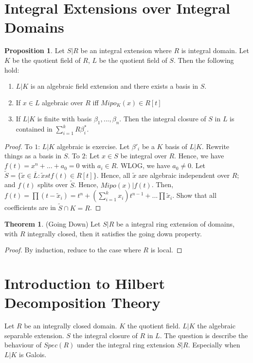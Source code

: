\documentclass{article}
\theoremstyle{definition}
\newtheorem{theorem}{Theorem}[section]
\theoremstyle{definition}
\theoremstyle{definition}
\newtheorem{proposition}{Proposition}[section]
\theoremstyle{definition}
\theoremstyle{definition}
\theoremstyle{definition}
\theoremstyle{definition}
\begin{document}
\section{Integral Extensions over Integral Domains}

\begin{tcolorbox}[colback=blue!5!white,colframe=blue!30!white]
\begin{proposition}
Let $S|R$ be an integral extension where $R$ is integral domain. Let $K$ be the quotient field of $R$, $L$ be the quotient field of $S$. Then the following hold:
\begin{enumerate}
    \item $L|K$ is an algebraic field extension and there exists a basis in $S$. 
    \item If $x\in L$ algebraic over $R$ iff $Mipo_K(x)\in R[t]$
    \item If $L|K$ is finite with basis $\beta_1,...,\beta_n$. Then the integral closure of $S$ in $L$ is contained in $\sum_{i=1}^{k} R\beta^*_i$. 
\end{enumerate} 
\end{proposition}
\end{tcolorbox}
\begin{proof}
    To $1$: $L|K$ algebraic is exercise.  Let $\beta'_i$ be a $K$ basis of $L|K$. Rewrite things as a basis in $S$. 
    To $2$: Let $x\in S$ be integral over $R$. Hence, we have $f(t)=x^n+...+a_0=0$ with $a_i\in R$. WLOG, we have $a_0\neq 0$. Let $\tilde{S}=\{ \tilde{x}\in \overline{L}: \tilde{x} st f(t)\in R[t] \}$. Hence, all $\tilde{x}$ are algebraic independent over $R$; and $f(t)$ splits over $\tilde{S}$. Hence, $Mipo(x)|f(t)$. Then, $f(t)=\prod (t-\tilde{x}_i)=t^n+(\sum_{i=1}^{k}x_i)t^{n-1}+...\prod \tilde{x}_i$. Show that all coefficients are in $\tilde{S}\cap K=R$. 
\end{proof}


\begin{tcolorbox}[colback=red!5!white,colframe=red!30!white]
\begin{theorem}
(Going Down) Let $S|R$ be a integral ring extension of domains, with $R$ integrally closed, then it satisfies the going down property.
\end{theorem}
\end{tcolorbox}
\begin{proof}
    By induction, reduce to the case where $R$ is local. 
\end{proof}

\section{Introduction to Hilbert Decomposition Theory}
Let $R$ be an integrally closed domain. $K$ the quotient field. $L|K$ the algebraic separable extension. $S$ the integral closure of $R$ in $L$. The question is describe the behaviour of $Spec(R)$ under the integral ring extension $S|R$. Especially when $L|K$ is Galois. 
\end{document}
